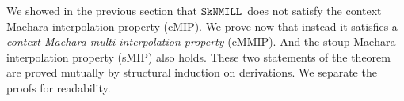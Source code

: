 \documentclass[sn-mathphys-num]{sn-jnl}%
\newcommand{\GG}{\Gamma}
\newcommand{\GD}{\Delta}
\newcommand{\vd}{\vdash}
\newcommand{\SkNMILL}{$\mathtt{SkNMILL}$}
\newcommand{\mf}[1]{\mathsf{#1}}
\newcommand{\gs}[1]{\sigma_{X} (#1)}
\newcommand{\sMIP}{\textsf{sMIP}}
\newcommand{\cMIP}{\textsf{cMIP}}
\newcommand{\cMMIP}{\textsf{cMMIP}}
\theoremstyle{thmstyleone}%
\newtheorem{theorem}{Theorem}%
\theoremstyle{thmstyletwo}%
\theoremstyle{thmstylethree}%
\begin{document}
We showed in the previous section that \SkNMILL~does not satisfy the context Maehara interpolation property (\cMIP). 
We prove now that instead it satisfies a \emph{context Maehara multi-interpolation property} (\cMMIP).
And the stoup Maehara interpolation property (\sMIP) also holds.
\genIntrp
These two statements of the theorem are proved mutually by structural induction on derivations.
We separate the proofs for readability.
\end{document}
